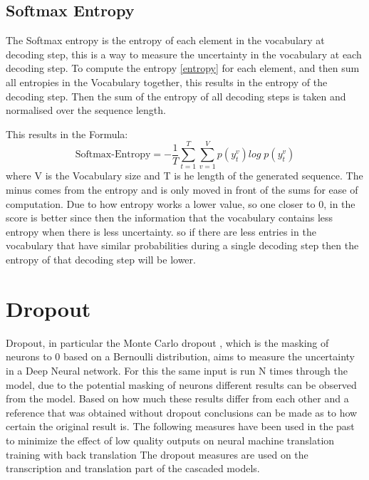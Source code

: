 \subsection{Softmax Entropy}\label{sect:entropy}
The Softmax entropy is the entropy of each element in the vocabulary at decoding step, this is a way to measure the uncertainty in the vocabulary at each decoding step.
To compute the entropy \autoref{entropy} for each element, and then sum all entropies in the Vocabulary together, this results in the entropy of the decoding step. 
Then the sum of the entropy of all decoding steps is taken and normalised over the sequence length. 

This results in the Formula:
$$\text{Softmax-Entropy}=-\frac{1}{T}\sum_{t=1}^T\sum_{v=1}^V p(y_t^v)log\; p(y_t^v) \label{formula:translation entropy}$$ where V is the Vocabulary size and T is he length of the generated sequence. The minus comes from the entropy and is only moved in front of the sums for ease of computation.
Due to how entropy works a lower value, so one closer to 0, in the score is better since then the information that the vocabulary contains less entropy when there is less uncertainty. so if there are less entries in the vocabulary that have similar probabilities during a single decoding step then the entropy of that decoding step will be lower.



\section{Dropout}
Dropout, in particular the Monte Carlo dropout \cite{gal2016dropoutbayesianapproximationrepresenting}, which is the masking of neurons to 0 based on a Bernoulli distribution, aims to measure the uncertainty in a Deep Neural network. 
For this the same input is run N times through the model, due to the potential masking of neurons different results can be observed from the model. Based on how much these results differ from each other and a reference that was obtained without dropout conclusions can be made as to how certain the original result is. 
The following measures have been used in the past to minimize the effect of low quality outputs on neural machine translation training with back translation \cite{wang-etal-2018-alibaba}
The dropout measures are used on the transcription and translation part of the cascaded models. 


